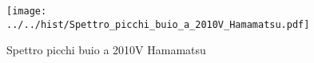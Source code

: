 \begin{figure}[h] \centering \texttt{[image: ../../hist/Spettro\_picchi\_buio\_a\_2010V\_Hamamatsu.pdf]}\caption{Spettro picchi buio a 2010V Hamamatsu}\label{hist:Spettro_picchi_buio_a_2010V_Hamamatsu} \end{figure}
